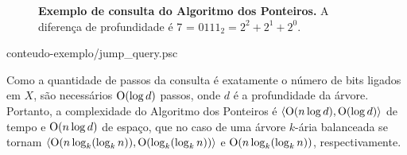 \begin{figure}
  \hspace{0cm}
  \centering
  \caption[Exemplo de consulta do Algoritmo dos Ponteiros.]
  {\textbf{Exemplo de consulta do Algoritmo dos Ponteiros.} A diferença de profundidade
  é 7 = $0111_2 = 2^2 + 2^1 + 2^0$.}
\end{figure}

\begin{program}[H]
  
  {conteudo-exemplo/jump_query.psc}

  \caption{Consulta do Algoritmo dos Ponteiros.\label{prog:jumpquery}}
\end{program}

Como a quantidade de passos da consulta é exatamente o número de bits ligados em $X$,
são necessários $\mathrm{O}(\log d)$ passos, onde $d$ é a profundidade da árvore. Portanto, a
complexidade do Algoritmo dos Ponteiros é $\langle \mathrm{O}(n \log d), \mathrm{O}(\log d) \rangle$
de tempo e $\mathrm{O}(n \log d)$ de espaço, que no caso de uma árvore $k$-ária balanceada
se tornam $\langle\mathrm{O}(n \log_k(\log_k n)), \mathrm{O}(\log_k(\log_k n)) \rangle$ e
$\mathrm{O}(n \log_k(\log_k n))$, respectivamente.


